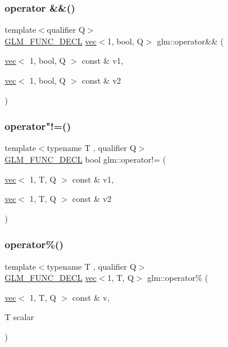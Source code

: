\subsubsection{\texorpdfstring{operator \&\&()}{operator \&\&()}}
{\footnotesize\ttfamily template$<$qualifier Q$>$ \\
\mbox{\hyperlink{setup_8hpp_ab2d052de21a70539923e9bcbf6e83a51}{G\+L\+M\+\_\+\+F\+U\+N\+C\+\_\+\+D\+E\+CL}} \mbox{\hyperlink{structglm_1_1vec}{vec}}$<$1, bool, Q$>$ glm\+::operator\&\& (\begin{DoxyParamCaption}\item[{\mbox{\hyperlink{structglm_1_1vec}{vec}}$<$ 1, bool, Q $>$ const \&}]{v1,  }\item[{\mbox{\hyperlink{structglm_1_1vec}{vec}}$<$ 1, bool, Q $>$ const \&}]{v2 }\end{DoxyParamCaption})}

\mbox{\label{group__ext__vec1_gadc81ac3efb2cc1678cb7ebe126d2e26d}} 
\subsubsection{\texorpdfstring{operator"!=()}{operator!=()}}
{\footnotesize\ttfamily template$<$typename T , qualifier Q$>$ \\
\mbox{\hyperlink{setup_8hpp_ab2d052de21a70539923e9bcbf6e83a51}{G\+L\+M\+\_\+\+F\+U\+N\+C\+\_\+\+D\+E\+CL}} bool glm\+::operator!= (\begin{DoxyParamCaption}\item[{\mbox{\hyperlink{structglm_1_1vec}{vec}}$<$ 1, T, Q $>$ const \&}]{v1,  }\item[{\mbox{\hyperlink{structglm_1_1vec}{vec}}$<$ 1, T, Q $>$ const \&}]{v2 }\end{DoxyParamCaption})}

\mbox{\label{group__ext__vec1_gac7110fb284669c629075b3ab29ad9b4f}} 
\subsubsection{\texorpdfstring{operator\%()}{operator\%()}\hspace{0.1cm}{\footnotesize\ttfamily [1/3]}}
{\footnotesize\ttfamily template$<$typename T , qualifier Q$>$ \\
\mbox{\hyperlink{setup_8hpp_ab2d052de21a70539923e9bcbf6e83a51}{G\+L\+M\+\_\+\+F\+U\+N\+C\+\_\+\+D\+E\+CL}} \mbox{\hyperlink{structglm_1_1vec}{vec}}$<$1, T, Q$>$ glm\+::operator\% (\begin{DoxyParamCaption}\item[{\mbox{\hyperlink{structglm_1_1vec}{vec}}$<$ 1, T, Q $>$ const \&}]{v,  }\item[{T}]{scalar }\end{DoxyParamCaption})}

